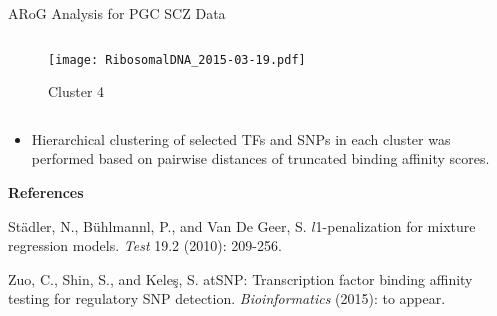 \documentclass[final]{beamer}
\newcommand{\bi}{\begin{itemize}}
\newcommand{\ei}{\end{itemize}}
\begin{document}
\begin{frame}{}
\begin{columns}[t]
\begin{column}{1\linewidth}
\begin{columns}
\begin{column}{.33\textwidth}
\begin{block}{ARoG Analysis for PGC SCZ Data}
\begin{columns}
 \begin{column}{.32\textwidth}                                                      
\begin{figure}[p]
  \centering
  \texttt{[image: RibosomalDNA\_2015-03-19.pdf]}
 \caption{{\small Cluster 4}}
\end{figure}
\end{column}
\end{columns}
\bi
\item[] Hierarchical clustering of selected TFs and SNPs in each cluster was performed based on pairwise distances of truncated binding affinity scores.
\ei

{\textbf{References}}
\centering
\bi
{\footnotesize
\item St\"{a}dler, N., B\"{u}hlmannl, P., and Van De Geer, S. $l$1-penalization for mixture regression models. \textit{Test} 19.2 (2010): 209-256.
\item Zuo, C., Shin, S., and Kele\c{s}, S. atSNP: Transcription factor binding affinity testing for regulatory SNP detection. \textit{Bioinformatics} (2015): to appear.}
\ei

\end{block}


\end{column}
\end{columns}


         \end{column}


     \hfill
     \end{columns}
  \end{frame}
\end{document}
